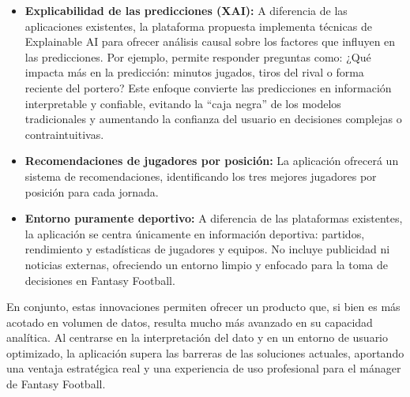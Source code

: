 \begin{itemize}
\item \textbf{Explicabilidad de las predicciones (XAI):} A diferencia de las aplicaciones 
existentes, la plataforma propuesta implementa técnicas de Explainable AI para ofrecer análisis causal 
sobre los factores que influyen en las predicciones. Por ejemplo, permite responder preguntas como: 
¿Qué impacta más en la predicción: minutos jugados, tiros del rival o forma reciente del portero? 
Este enfoque convierte las predicciones en información interpretable y confiable, evitando la ``caja 
negra'' de los modelos tradicionales y aumentando la confianza del usuario en decisiones complejas o 
contraintuitivas.

\item \textbf{Recomendaciones de jugadores por posición:} La aplicación ofrecerá un sistema de 
recomendaciones, identificando los tres mejores jugadores por posición para cada jornada.

\item \textbf{Entorno puramente deportivo:} A diferencia de las plataformas existentes, la 
aplicación se centra únicamente en información deportiva: partidos, rendimiento y estadísticas de 
jugadores y equipos. No incluye publicidad ni noticias externas, ofreciendo un entorno limpio y 
enfocado para la toma de decisiones en Fantasy Football.
\end{itemize}

En conjunto, estas innovaciones permiten ofrecer un producto que, si bien es más acotado en volumen 
de datos, resulta mucho más avanzado en su capacidad analítica. Al centrarse en la interpretación del 
dato y en un entorno de usuario optimizado, la aplicación supera las barreras de las soluciones 
actuales, aportando una ventaja estratégica real y una experiencia de uso profesional para el mánager 
de Fantasy Football.

